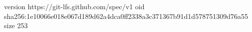 version https://git-lfs.github.com/spec/v1
oid sha256:1e10066e018e067d189d62a4dca0ff2338a3c371367b91d1d578751309d76a55
size 253
